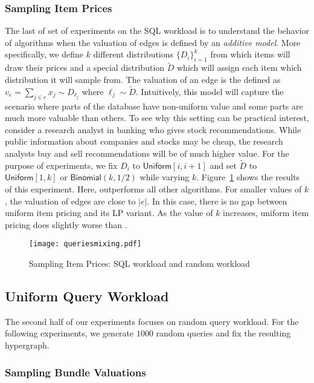\subsubsection{Sampling Item Prices} The last of set of experiments on the SQL workload is to understand the behavior of algorithms when the valuation of edges is defined by an \emph{additive model}. More specifically, we define $k$ different distributions $\{D_i\}_{i=1}^{k}$ from which items will draw their prices and a special distribution $\tilde{D}$ which will assign each item which distribution it will sample from. The valuation of an edge is the defined as $v_e = \sum_{j \in e} x_j \sim D_{\ell_j}$ where $\ell_j \sim \tilde{D}$. Intuitively, this model will capture the scenario where parts of the database have non-uniform value and some parts are much more valuable than others. To see why this setting can be practical interest, consider a research analyst in banking who gives stock recommendations. While public information about companies and stocks may be cheap, the research analysts buy and sell recommendations will be of much higher value. For the purpose of experiments, we fix $D_i$ to $\textsf{Uniform}[i, i+1]$ and set $\tilde{D}$ to $\textsf{Uniform}[1, k]$ or $\textsf{Binomial}(k, 1/2)$ while varying $k$. Figure~\ref{fig:mixing} shows the results of this experiment. Here, \lpip outperforms all other algorithms. For smaller values of $k$, the valuation of edges are close to $|e|$. In this case, there is no gap between uniform item pricing and its LP variant. As  the value of $k$ increases, uniform item pricing does slightly worse than \lpip.


\begin{figure}[!t]
	\centering
	\texttt{[image: queriesmixing.pdf]}
	\caption{Sampling Item Prices: SQL workload and random workload} \label{fig:mixing}
\end{figure}  

\subsection{Uniform Query Workload}


The second half of our experiments focuses on random query workload. For the following experiments, we generate $1000$ random queries and fix the resulting hypergraph. 

\subsubsection{Sampling Bundle Valuations}

